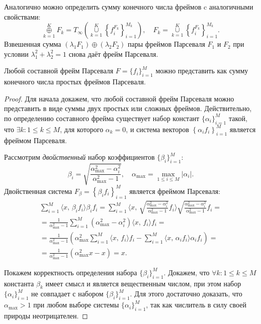 Аналогично можно определить сумму конечного числа фреймов c аналогичными свойствами:
$$
\overset{K}{\underset{k = 1}{\oplus}} F_k = T_\infty\left(\overset{K}{\underset{k = 1}{\cup}} \left\{
f_i^{F_k}\right\}_{i=1}^{M_k}\right), \quad
F_k = \overset{K}{\underset{k = 1}{\cup}}  \left\{f_i^{F_k}\right\}_{i=1}^{M_k}.
$$
Взвешенная сумма $(\lambda_1 F_1)  \oplus  (\lambda_2 F_2 )$ пары фреймов Парсеваля $F_1$ и $F_2$
при условии $\lambda_1^2 + \lambda_2^2 = 1$ снова даёт фрейм Парсеваля.
\begin{theorem}
Любой составной фрейм Парсеваля $F = \{f_i \}_{i=1}^M$ можно представить как сумму конечного числа простых фреймов Парсеваля.
\end{theorem}

\begin{proof}
Для начала докажем, что любой составной фрейм Парсеваля можно представить в виде суммы двух простых или сложных фреймов.
Действительно, по определению составного фрейма существует набор констант $\{\alpha_i \}_{i=1}^M$ такой,
что $\exists k : 1 \leq k \leq M$, для которого $\alpha_k = 0$, и система векторов $\left\{\alpha_i f_i\right\}_{i=1}^M$
является фреймом Парсеваля.

Рассмотрим {\it двойственный} набор коэффициентов $\{\beta_i\}_{i=1}^M$:
$$
\beta_i = \sqrt{\frac{\alpha_{\max}^2 - \alpha_i^2}{\alpha_{\max}^2 - 1}}, \quad \alpha_{\max} = \max_{1 \leq i \leq M}{|\alpha_i|}.
$$
Двойственная система $F_\beta = \left\{\beta_i f_i\right\}_{i=1}^M$ является фреймом Парсеваля:
\begin{multline*}
\sum_{i=1}^M \langle  x,\, \beta_i f_i \rangle \beta_i f_i
= \sum_{i=1}^M \langle x,\, \sqrt{\frac{\alpha_{\max}^2 - \alpha_i^2}{\alpha_{\max}^2 - 1}} f_i  \rangle \sqrt{\frac{\alpha_{\max}^2
- \alpha_i^2}{\alpha_{\max}^2 - 1}} f_i =\\
= \frac{1}{\alpha_{\max}^2 - 1} \sum_{i=1}^M \left(\alpha_{\max}^2 - \alpha_i^2\right) \langle  x,\, f_i \rangle f_i = \\
= \frac{1}{\alpha_{\max}^2 - 1} \left( \alpha_{\max}^2 \sum_{i=1}^M \langle x,\, f_i \rangle f_i -
\sum_{i=1}^M \langle x,\, \alpha_i f_i \rangle \alpha_i f_i \right) = \\
= \frac{1}{\alpha_{\max}^2 - 1} \left( \alpha_{\max}^2 x - x \right) = x.
\end{multline*}

Покажем корректность определения набора $\{\beta_i\}_{i=1}^M$. Докажем, что $\forall k: 1 \leq k \leq M$ константа $\beta_k$ имеет
смысл и является вещественным числом, при этом набор $\{\alpha_i\}_{i=1}^M$ не совпадает с набором $\{\beta_i\}_{i=1}^M$.
Для этого достаточно доказать, что $\alpha_{\max} > 1$ при любом выборе системы $\{\alpha_i\}_{i=1}^M$, так как числитель
в силу своей природы неотрицателен.


\end{proof}
